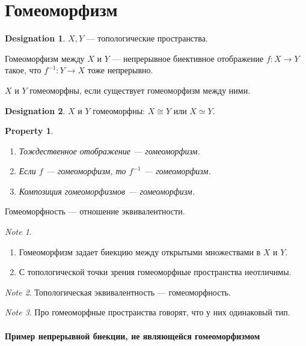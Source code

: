 \documentclass[11pt]{book}
\theoremstyle{definition}
\theoremstyle{plain}
\theoremstyle{plain}
\newtheorem*{prop}{Property}
\theoremstyle{definition}
\newtheorem*{name}{Designation}
\theoremstyle{remark}
\newtheorem*{note}{Note}
\begin{document}
\section{Гомеоморфизм}
\begin{name}
    $ X, Y$ --- топологические пространства.
\end{name}
\begin{defn}
    Гомеоморфизм между  $ X$ и $ Y$  --- непрерывное биективное отображение $ f: X \to  Y$ такое, что $ f^{-1} : Y \to  X$ тоже непрерывно.
\end{defn}
\begin{defn}
    $ X$ и $ Y$ гомеоморфны, если существует гомеоморфизм между ними.
\end{defn}
\begin{name}
    $ X$ и $ Y$ гомеоморфны: $ X \cong Y$ или $ X \simeq Y$.
\end{name}
\begin{prop}
    $ $
    \begin{enumerate}
	\item Тождественное отображение --- гомеоморфизм.
	\item Если $ f$ --- гомеоморфизм, то $ f^{-1}$ --- гомеоморфизм.
	\item Композиция  гомеоморфизмов --- гомеоморфизм.
    \end{enumerate}
\end{prop}
\begin{thm}
    Гомеоморфность --- отношение эквивалентности.
\end{thm}
\begin{note}
    $ $
    \begin{enumerate}
	\item Гомеоморфизм задает биекцию между открытыми множествами в $ X$ и $ Y$.
	\item С топологической точки зрения гомеоморфные пространства неотличимы.
    \end{enumerate}
\end{note}
\begin{note}
    Топологическая эквивалентность --- гомеоморфность.
\end{note}
\begin{note}
    Про гомеоморфные пространства говорят, что у них одинаковый тип.
\end{note}
\paragraph{Пример непрерывной биекции, не являющейся гомеоморфизмом}
$ $
\end{document}
